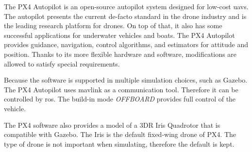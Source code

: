 The PX4 Autopilot is an open\hyp{}source autopilot system designed for low\hyp{}cost \acsp{uav}. The autopilot presents the current de-facto standard in the drone industry and is the leading research platform for drones. On top of that, it also has some successful applications for underwater vehicles and boats. The PX4 Autopilot provides guidance, navigation, control algorithms, and estimators for attitude and position. Thanks to its more flexible hardware and software, modifications are allowed to satisfy special requirements. \cite{px4} \cite{dronecode_projects}

Because the software is supported in multiple simulation choices, such as Gazebo. The PX4 Autopilot uses \acs{mavlink} as a communication tool. Therefore it can be controlled by \acs{ros}. The build\hyp{}in mode \textit{OFFBOARD} provides full control of the vehicle. \cite{mimmoimplementation}

The PX4 software also provides a model of a 3DR Iris Quadrotor that is compatible with Gazebo. The Iris is the default fixed\hyp{}wing drone of PX4. The type of drone is not important when simulating, therefore the default is kept.